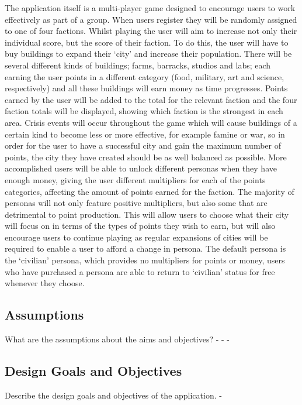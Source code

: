 \documentclass{sig-alt-release2}
\begin{document}
The application itself is a multi-player game designed to encourage users to work effectively as part of a group. When users register they will be randomly assigned to one of four factions. Whilst playing the user will aim to increase not only their individual score, but the score of their faction. To do this, the user will have to buy buildings to expand their `city' and increase their population. There will be several different kinds of buildings; farms, barracks, studios and labs; each earning the user points in a different category (food, military, art and science, respectively) and all these buildings will earn money as time progresses. Points earned by the user will be added to the total for the relevant faction and the four faction totals will be displayed, showing which faction is the strongest in each area. Crisis events will occur throughout the game which will cause buildings of a certain kind to become less or more effective, for example famine or war, so in order for the user to have a successful city and gain the maximum number of points, the city they have created should be as well balanced as possible. More accomplished users will be able to unlock different personas when they have enough money, giving the user different multipliers for each of the points categories, affecting the amount of points earned for the faction. The majority of personas will not only feature positive multipliers, but also some that are detrimental to point production. This will allow users to choose what their city will focus on in terms of the types of points they wish to earn, but will also encourage users to continue playing as regular expansions of cities will be required to enable a user to afford a change in persona. The default persona is the `civilian' persona, which provides no multipliers for points or money, users who have purchased a persona are able to return to `civilian' status for free whenever they choose.

\subsection{Assumptions}

What are the assumptions about the aims and objectives?
-
- 
-


\subsection{Design Goals and Objectives} 

Describe the design goals and objectives of the application.
-
\end{document}
